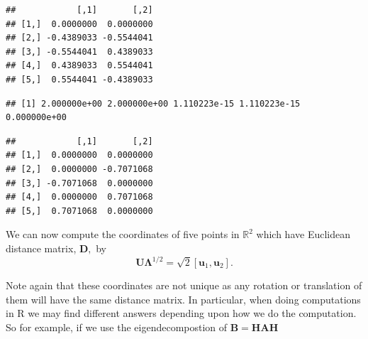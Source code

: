 \documentclass[
]{book}
\newenvironment{Shaded}{\begin{snugshade}}{\end{snugshade}}
\newcommand{\CommentTok}[1]{\textcolor[rgb]{0.56,0.35,0.01}{\textit{#1}}}
\newcommand{\DecValTok}[1]{\textcolor[rgb]{0.00,0.00,0.81}{#1}}
\newcommand{\FunctionTok}[1]{\textcolor[rgb]{0.13,0.29,0.53}{\textbf{#1}}}
\newcommand{\NormalTok}[1]{#1}
\newcommand{\OtherTok}[1]{\textcolor[rgb]{0.56,0.35,0.01}{#1}}
\newcommand{\SpecialCharTok}[1]{\textcolor[rgb]{0.81,0.36,0.00}{\textbf{#1}}}
\theoremstyle{definition}
\theoremstyle{definition}
\theoremstyle{definition}
\theoremstyle{definition}
\theoremstyle{remark}
\begin{document}
\begin{verbatim}
##            [,1]       [,2]
## [1,]  0.0000000  0.0000000
## [2,] -0.4389033 -0.5544041
## [3,] -0.5544041  0.4389033
## [4,]  0.4389033  0.5544041
## [5,]  0.5544041 -0.4389033
\end{verbatim}

\begin{Shaded}
\end{Shaded}

\begin{verbatim}
## [1] 2.000000e+00 2.000000e+00 1.110223e-15 1.110223e-15 0.000000e+00
\end{verbatim}

\begin{Shaded}
\end{Shaded}

\begin{verbatim}
##            [,1]       [,2]
## [1,]  0.0000000  0.0000000
## [2,]  0.0000000 -0.7071068
## [3,] -0.7071068  0.0000000
## [4,]  0.0000000  0.7071068
## [5,]  0.7071068  0.0000000
\end{verbatim}

We can now compute the coordinates of five points in \(\mathbb{R}^2\) which have Euclidean distance matrix, \(\mathbf D,\) by
\[
\mathbf U\boldsymbol \Lambda^{1/2}=\sqrt{2}[\mathbf u_1 , \mathbf u_2].\]

Note again that these coordinates are not unique as any rotation or translation of them will have the same distance matrix. In particular, when doing computations in R we may find different answers depending upon how we do the computation. So for example, if we use the eigendecompostion of \(\mathbf B= \mathbf H\mathbf A\mathbf H\)

\begin{Shaded}
\end{Shaded}
\end{document}
